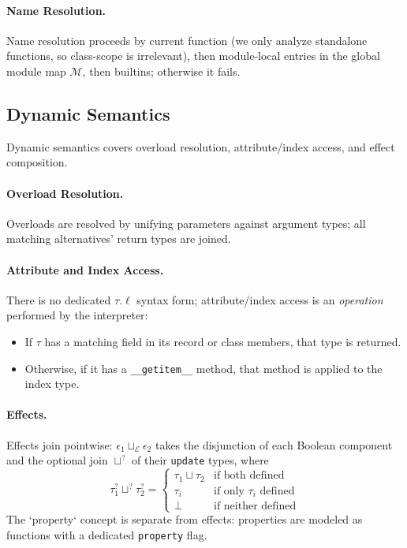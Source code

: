 \paragraph{Name Resolution.}  
Name resolution proceeds by current function (we only analyze standalone functions, so class-scope is irrelevant), then module‐local entries in the global module map $\mathcal{M}$, then builtins; otherwise it fails.

\subsection{Dynamic Semantics}

Dynamic semantics covers overload resolution, attribute/index access, and effect composition.

\paragraph{Overload Resolution.}  
Overloads are resolved by unifying parameters against argument types; all matching alternatives’ return types are joined.

\paragraph{Attribute and Index Access.}  
There is no dedicated $\tau.\ell$ syntax form; attribute/index access is an \emph{operation} performed by the interpreter:  
\begin{itemize}
\item If $\tau$ has a matching field in its record or class members, that type is returned.
\item Otherwise, if it has a \texttt{\_\_getitem\_\_} method, that method is applied to the index type.
\end{itemize}

\paragraph{Effects.}  
Effects join pointwise: $\epsilon_1 \sqcup_{\mathcal{E}} \epsilon_2$ 
takes the disjunction of each Boolean component and the optional join $\sqcup^?$ of their \texttt{update} types, where
\[
\tau_1^? \sqcup^? \tau_2^? =
\begin{cases}
\tau_1 \sqcup \tau_2 & \text{if both defined} \\
\tau_i & \text{if only } \tau_i \text{ defined} \\
\bot & \text{if neither defined}
\end{cases}
\]
The `property` concept is separate from effects: properties are modeled as functions with a dedicated \texttt{property} flag.

